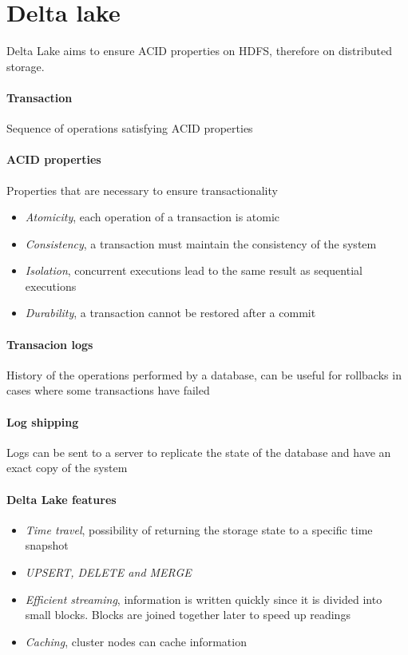 \section{Delta lake}
Delta Lake aims to ensure ACID properties on HDFS, therefore on distributed storage.

\paragraph{Transaction} 
Sequence of operations satisfying ACID properties

\paragraph{ACID properties} 
Properties that are necessary to ensure transactionality
\begin{itemize}
    \item \textit{Atomicity}, each operation of a transaction is atomic
    \item \textit{Consistency}, a transaction must maintain the consistency of the system
    \item \textit{Isolation}, concurrent executions lead to the same result as sequential executions
    \item \textit{Durability}, a transaction cannot be restored after a commit
\end{itemize}

\paragraph{Transacion logs} History of the operations performed by a database, can be useful for rollbacks in cases where some transactions have failed

\paragraph{Log shipping} Logs can be sent to a server to replicate the state of the database and have an exact copy of the system

\paragraph{Delta Lake features}
\begin{itemize}
    \item \textit{Time travel}, possibility of returning the storage state to a specific time snapshot
    \item \textit{UPSERT, DELETE and MERGE}
    \item \textit{Efficient streaming}, information is written quickly since it is divided into small blocks. Blocks are joined together later to speed up readings
    \item \textit{Caching}, cluster nodes can cache information
\end{itemize}

\newpage